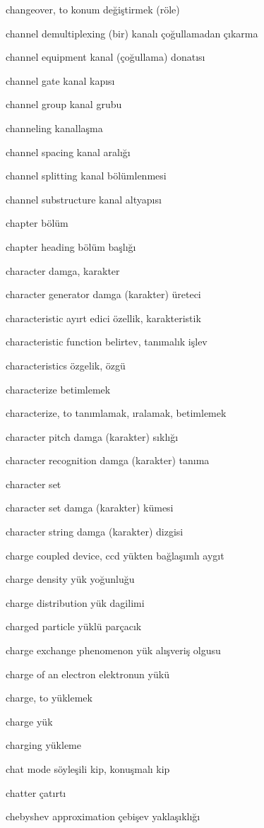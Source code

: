 \documentclass[12pt,fleqn]{article}\usepackage{../../common}
\begin{document}
changeover, to konum değiştirmek (röle)

channel demultiplexing (bir) kanalı çoğullamadan çıkarma

channel equipment kanal (çoğullama) donatısı

channel gate kanal kapısı

channel group kanal grubu

channeling kanallaşma

channel spacing kanal aralığı

channel splitting kanal bölümlenmesi

channel substructure kanal altyapısı

chapter bölüm

chapter heading bölüm başlığı

character damga, karakter

character generator damga (karakter) üreteci

characteristic ayırt edici özellik, karakteristik

characteristic function belirtev, tanımalık işlev

characteristics özgelik, özgü

characterize betimlemek

characterize, to tanımlamak, ıralamak, betimlemek

character pitch damga (karakter) sıklığı

character recognition damga (karakter) tanıma

character set

character set damga (karakter) kümesi

character string damga (karakter) dizgisi

charge coupled device, ccd yükten bağlaşımlı aygıt

charge density yük yoğunluğu

charge distribution yük dagilimi

charged particle yüklü parçacık

charge exchange phenomenon yük alışveriş olgusu

charge of an electron elektronun yükü

charge, to yüklemek

charge yük

charging yükleme

chat mode söyleşili kip, konuşmalı kip

chatter çatırtı

chebyshev approximation çebişev yaklaşıklığı
\end{document}
